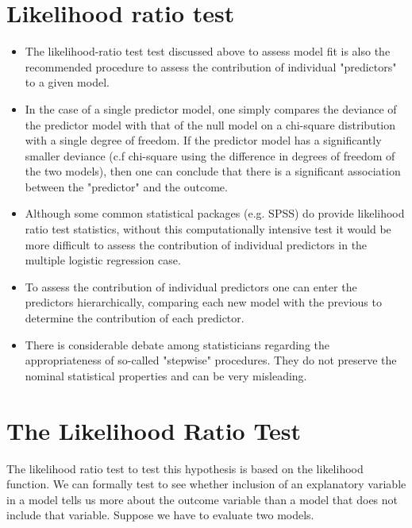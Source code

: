 \documentclass[a4paper,12pt]{article}
\begin{document}
\section{Likelihood ratio test}
\begin{itemize}
	\item The likelihood-ratio test test discussed above to assess model fit is also the recommended procedure to assess the contribution of individual "predictors" to a given model.
	
	\item In the case of a single predictor model, one simply compares the deviance of the predictor model with that of the null model on a chi-square distribution with a single degree of freedom. If the predictor model has a significantly smaller deviance (c.f chi-square using the difference in degrees of freedom of the two models), then one can conclude that there is a significant association between the "predictor" and the outcome. 
	\item Although some common statistical packages (e.g. SPSS) do provide likelihood ratio test statistics, without this computationally intensive test it would be more difficult to assess the contribution of individual predictors in the multiple logistic regression case. 
	\item To assess the contribution of individual predictors one can enter the predictors hierarchically, comparing each new model with the previous to determine the contribution of each predictor.
	\item There is considerable debate among statisticians regarding the appropriateness of so-called "stepwise" procedures. They do not preserve the nominal statistical properties and can be very misleading.
\end{itemize}


\section{The Likelihood Ratio Test}
The likelihood ratio test to test this hypothesis is based on the likelihood
function. We can formally test to see whether inclusion of an explanatory variable in a model tells us
more about the outcome variable than a model that does not include that variable. Suppose
we have to evaluate two models. 
\end{document}
